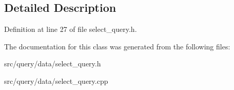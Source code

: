 \subsection{Detailed Description}


Definition at line 27 of file select\+\_\+query.\+h.



The documentation for this class was generated from the following files\+:\begin{DoxyCompactItemize}
\item 
src/query/data/select\+\_\+query.\+h\item 
src/query/data/select\+\_\+query.\+cpp\end{DoxyCompactItemize}
